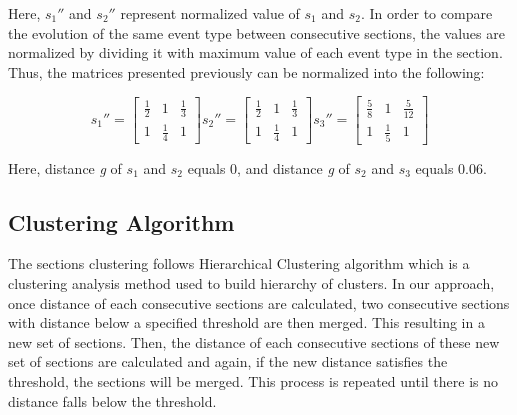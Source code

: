 Here, $s_1''$ and $s_2''$ represent normalized value of $s_1$ and $s_2$. In order to compare the evolution of the same event type between consecutive sections, the values are normalized by dividing it with maximum value of each event type in the section. Thus, the matrices presented previously can be normalized into the following:

\[
s_1'' = \begin{bmatrix}
  \frac{1}{2} & 1 & \frac{1}{3}\\ 
  1 & \frac{1}{4} & 1
\end{bmatrix}
s_2'' = \begin{bmatrix}
  \frac{1}{2} & 1 & \frac{1}{3}\\ 
  1 & \frac{1}{4} & 1
\end{bmatrix}
s_3'' = \begin{bmatrix}
  \frac{5}{8} & 1 & \frac{5}{12}\\
  1 & \frac{1}{5} & 1 
\end{bmatrix}
\]

Here, distance \textit{g} of $s_1$ and $s_2$ equals 0, and distance \textit{g} of $s_2$ and $s_3$ equals 0.06. 

\subsection{Clustering Algorithm}
The sections clustering follows Hierarchical Clustering algorithm \cite{maimon} which is a clustering analysis method used to build hierarchy of clusters. In our approach, once distance of each consecutive sections are calculated, two consecutive sections with distance below a specified threshold are then merged. This resulting in a new set of sections. Then, the distance of each consecutive sections of these new set of sections are calculated and again, if the new distance satisfies the threshold, the sections will be merged. This process is repeated until there is no distance falls below the threshold.







